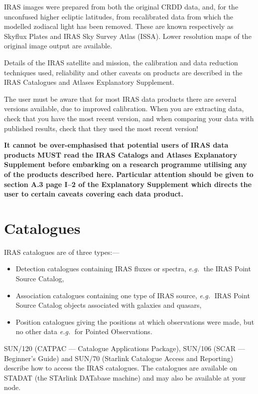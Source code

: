 IRAS images were prepared from both the original CRDD data, and, for the
unconfused higher ecliptic latitudes, from recalibrated data from which the
modelled zodiacal light has been removed. These are known respectively as
Skyflux Plates and IRAS Sky Survey Atlas (ISSA). Lower resolution maps of the
original image output are available.

Details of the IRAS satellite and mission, the calibration and data
reduction techniques used, reliability and other caveats on products are
described in the IRAS Catalogues and Atlases Explanatory Supplement.

The user must be aware that for most IRAS data products there are several
versions available, due to improved calibration. When you are extracting data,
check that you have the most recent version, and when comparing your data with
published results, check that they used the most recent version!

{\bf It cannot be over-emphasised that potential users of IRAS data products
MUST read the IRAS Catalogs and Atlases Explanatory Supplement before embarking
on a research programme utilising any of the products described here.
Particular attention should be given to section A.3 page I--2 of the Explanatory
Supplement which directs the user to certain caveats covering each data
product.}

\section {Catalogues}
\label{m:cats}
IRAS catalogues are of three types:---
\begin{itemize}
\item Detection catalogues containing IRAS fluxes or spectra, {\em e.g.}$\;$ the
IRAS Point Source Catalog,
\item Association catalogues containing one type of IRAS source,
{\em e.g.}$\;$ IRAS Point Source Catalog objects associated with galaxies
and quasars,
\item Position catalogues giving the positions at which observations were
made, but no other data {\em e.g.}$\;$ for Pointed Observations.
\end{itemize}
SUN/120 (CATPAC --- Catalogue Applications Package),
SUN/106 (SCAR --- Beginner's Guide) and SUN/70 (Starlink Catalogue Access and
Reporting) describe how to access the IRAS catalogues. The catalogues are
available on STADAT (the STArlink DATabase machine) and may also be available
at your node.

